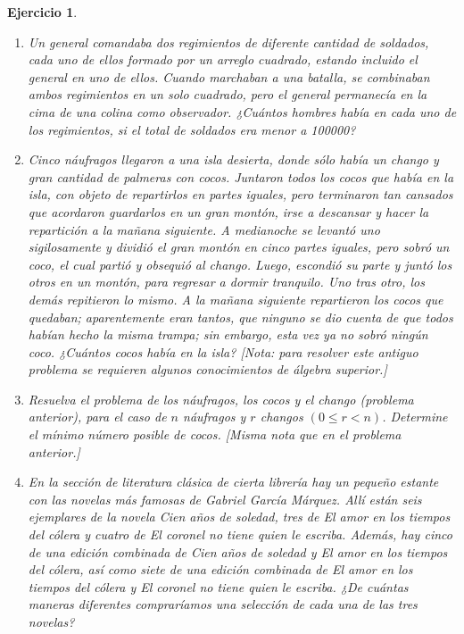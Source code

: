 \documentclass[12pt,twoside]{article}
\newtheorem{Ejer}{Ejercicio}
\begin{document}
\begin{Ejer}
\begin{enumerate}
\item Un general comandaba dos regimientos de diferente cantidad de soldados, cada uno de ellos formado por un arreglo cuadrado, estando incluido el general en uno de ellos. Cuando marchaban a una batalla, se combinaban ambos regimientos en un solo cuadrado, pero el general permanecía en la cima de una colina como observador. ¿Cuántos hombres había en cada uno de los regimientos, si el total de soldados era menor a 100000?

\item Cinco náufragos llegaron a una isla desierta, donde sólo había un chango y gran cantidad de palmeras con cocos. Juntaron todos los cocos que había en la isla, con objeto de repartirlos en partes iguales, pero terminaron tan cansados que acordaron guardarlos en un gran montón, irse a descansar y hacer la repartición a la mañana siguiente. A medianoche se levantó uno sigilosamente y dividió el gran montón en cinco partes iguales, pero sobró un coco, el cual partió y obsequió al chango. Luego, escondió su parte y juntó los otros en un montón, para regresar a dormir tranquilo. Uno tras otro, los demás repitieron lo mismo. A la mañana siguiente repartieron los cocos que quedaban; aparentemente eran tantos, que ninguno se dio cuenta de que todos habían hecho la misma trampa; sin embargo, esta vez ya no sobró ningún coco. ¿Cuántos cocos había en la isla? [Nota: para resolver este antiguo problema se requieren algunos conocimientos de álgebra superior.]

\item Resuelva el problema de los náufragos, los cocos y el chango (problema anterior), para el caso de $n$ náufragos y $r$ changos $(0 \le r < n)$. Determine el mínimo número posible de cocos. [Misma nota que en el problema anterior.]

\item En la sección de literatura clásica de cierta librería hay un pequeño estante con las novelas más famosas de Gabriel García Márquez. Allí están seis ejemplares de la novela \textit{Cien años de soledad}, tres de \textit{El amor en los tiempos del cólera} y cuatro de \textit{El coronel no tiene quien le escriba}. Además, hay cinco de una edición combinada de \textit{Cien años de soledad} y \textit{El amor en los tiempos del cólera}, así como siete de una edición combinada de \textit{El amor en los tiempos del cólera} y \textit{El coronel no tiene quien le escriba}. ¿De cuántas maneras diferentes compraríamos una selección de cada una de las tres novelas?


\end{enumerate}
\end{Ejer}
\end{document}
